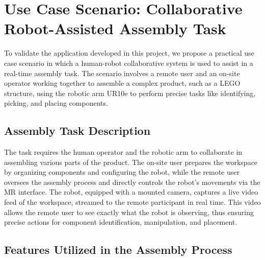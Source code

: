     \section{Use Case Scenario: Collaborative Robot-Assisted Assembly Task}
    \label{sec:use_case}
    
    To validate the application developed in this project, we propose a practical use case scenario in which a human-robot collaborative system is used to assist in a real-time assembly task. The scenario involves a remote user and an on-site operator working together to assemble a complex product, such as a LEGO structure, using the robotic arm UR10e to perform precise tasks like identifying, picking, and placing components.
    
    \subsection{Assembly Task Description}
    The task requires the human operator and the robotic arm to collaborate in assembling various parts of the product. The on-site user prepares the workspace by organizing components and configuring the robot, while the remote user oversees the assembly process and directly controls the robot's movements via the \ac{MR} interface. The robot, equipped with a mounted camera, captures a live video feed of the workspace, streamed to the remote participant in real time. This video allows the remote user to see exactly what the robot is observing, thus ensuring precise actions for component identification, manipulation, and placement.
    
    \subsection{Features Utilized in the Assembly Process}
    
